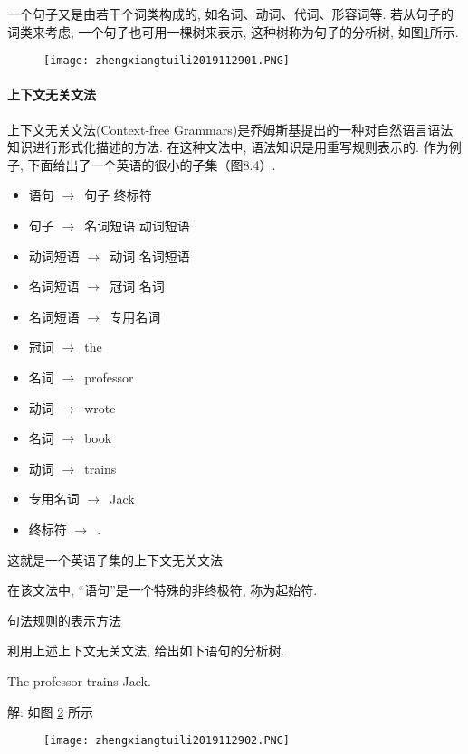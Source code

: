 一个句子又是由若干个词类构成的, 如名词、动词、代词、形容词等. 若从句子的词类来考虑, 一个句子也可用一棵树来表示, 这种树称为句子的分析树, 如图\ref{AI32fig2901}所示.
\begin{figure}[H]
\centering
\texttt{[image: zhengxiangtuili2019112901.PNG]}
\caption{}
\label{AI32fig2901}
\end{figure}
\paragraph{上下文无关文法}
上下文无关文法(Context-free  Grammars)是乔姆斯基提出的一种对自然语言语法知识进行形式化描述的方法. 在这种文法中, 语法知识是用重写规则表示的. 作为例子, 下面给出了一个英语的很小的子集（图8.4）.

\begin{itemize}
\item 语句 $\rightarrow$\,  句子   终标符
\item 句子 $\rightarrow$\,  名词短语   动词短语
\item 动词短语 $\rightarrow$\,  动词   名词短语
\item 名词短语 $\rightarrow$\,  冠词   名词
\item 名词短语 $\rightarrow$\,  专用名词
\item 冠词 $\rightarrow$\,  the
\item 名词 $\rightarrow$\,  professor
\item 动词 $\rightarrow$\,  wrote
\item 名词 $\rightarrow$\,  book
\item 动词 $\rightarrow$\,  trains
\item 专用名词 $\rightarrow$\,  Jack
\item 终标符 $\rightarrow$\, .
\end{itemize}
这就是一个英语子集的上下文无关文法

在该文法中, “语句”是一个特殊的非终极符, 称为起始符.

句法规则的表示方法

\begin{example}
利用上述上下文无关文法, 给出如下语句的分析树.

The  professor  trains  Jack.
\end{example}

解: 如图 \ref{AI32fig2902} 所示
\begin{figure}[H]
\centering
\texttt{[image: zhengxiangtuili2019112902.PNG]}
\caption{}
\label{AI32fig2902}
\end{figure}
